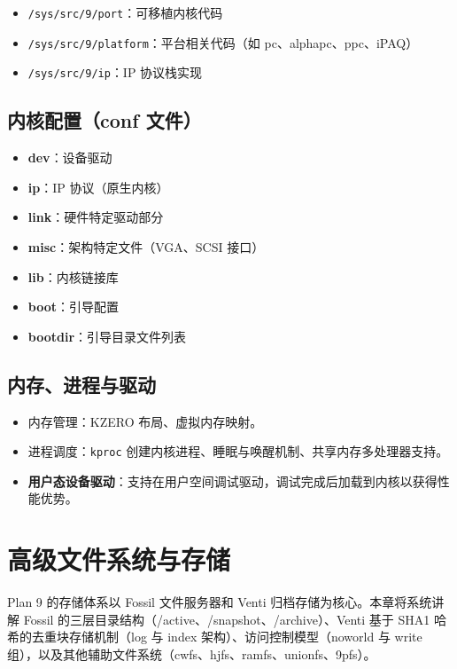 \documentclass[12pt,UTF8]{ctexbook}
\begin{document}
\begin{itemize}
\item \texttt{/sys/src/9/port}：可移植内核代码
\item \texttt{/sys/src/9/platform}：平台相关代码（如 pc、alphapc、ppc、iPAQ）
\item \texttt{/sys/src/9/ip}：IP 协议栈实现
\end{itemize}

\section{内核配置（conf 文件）}

\begin{itemize}
\item \textbf{dev}：设备驱动
\item \textbf{ip}：IP 协议（原生内核）
\item \textbf{link}：硬件特定驱动部分
\item \textbf{misc}：架构特定文件（VGA、SCSI 接口）
\item \textbf{lib}：内核链接库
\item \textbf{boot}：引导配置
\item \textbf{bootdir}：引导目录文件列表
\end{itemize}

\section{内存、进程与驱动}

\begin{itemize}
\item 内存管理：KZERO 布局、虚拟内存映射。
\item 进程调度：\texttt{kproc} 创建内核进程、睡眠与唤醒机制、共享内存多处理器支持。
\item \textbf{用户态设备驱动}：支持在用户空间调试驱动，调试完成后加载到内核以获得性能优势。
\end{itemize}

\chapter{高级文件系统与存储}

Plan 9 的存储体系以 Fossil 文件服务器和 Venti 归档存储为核心。本章将系统讲解 Fossil 的三层目录结构（/active、/snapshot、/archive）、Venti 基于 SHA1 哈希的去重块存储机制（log 与 index 架构）、访问控制模型（noworld 与 write 组），以及其他辅助文件系统（cwfs、hjfs、ramfs、unionfs、9pfs）。
\end{document}
